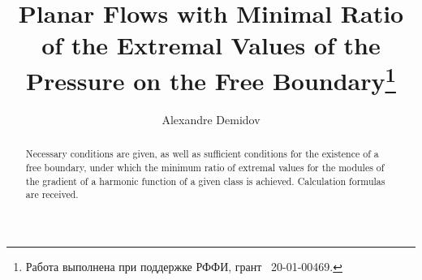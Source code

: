 \begin{englishtitle}
\title{Planar Flows with Minimal Ratio of the Extremal
Values of the Pressure on the Free Boundary\thanks{Работа выполнена при поддержке РФФИ, 
грант \textnumero~20-01-00469.}}
\author{Alexandre Demidov}

\maketitle

\begin{abstract}
Necessary conditions are given, as well as sufficient conditions 
for the existence of a free boundary, under which the minimum ratio 
of extremal values for  the modules of the gradient of a harmonic 
function of a given class is achieved. Calculation formulas are received. 


\end{abstract}
\end{englishtitle}



\iffalse

\documentclass[12pt]{llncs}
\usepackage[T2A]{fontenc}
\usepackage[utf8]{inputenc}
\usepackage[english,russian]{babel}
\usepackage[russian]{nla}
\usepackage{graphicx}


